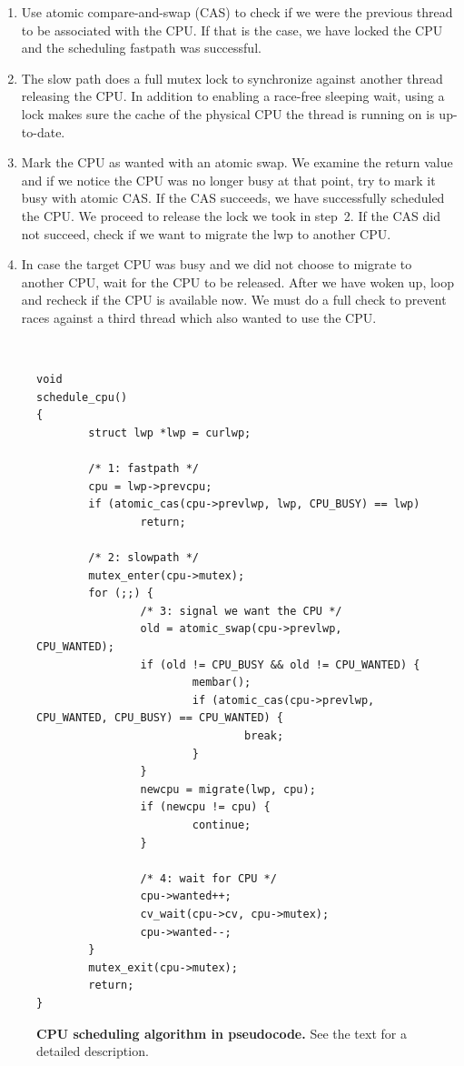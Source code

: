\begin{enumerate}
\item   Use atomic compare-and-swap (CAS) to check if we were the
	previous thread to be associated with the CPU.  If that is
	the case, we have locked the CPU and the scheduling fastpath
	was successful.

\item   The slow path does a full mutex lock to synchronize against
	another thread releasing the CPU.  In addition to enabling
	a race-free sleeping wait, using a lock makes sure the cache of
	the physical CPU the thread is running on is up-to-date.

\item   Mark the CPU as wanted with an atomic swap.  We examine
	the return value and if we notice the CPU was no longer
	busy at that point, try to mark it busy with atomic CAS.
	If the CAS succeeds, we have successfully scheduled the CPU.
	We proceed to release the lock we took in step~2.  If the
	CAS did not succeed, check if we want to migrate the lwp
	to another CPU.

\item   In case the target CPU was busy and we did not choose to
	migrate to another CPU, wait for the CPU to be released.
	After we have woken up, loop and recheck if the CPU is
	available now.  We must do a full check to prevent races
	against a third thread which also wanted to use the CPU.
\end{enumerate}

\begin{figure}[h]
{\tt \scriptsize  
\begin{verbatim}
void
schedule_cpu()
{
        struct lwp *lwp = curlwp;

        /* 1: fastpath */
        cpu = lwp->prevcpu;
        if (atomic_cas(cpu->prevlwp, lwp, CPU_BUSY) == lwp)
                return;

        /* 2: slowpath */
        mutex_enter(cpu->mutex);
        for (;;) {
                /* 3: signal we want the CPU */
                old = atomic_swap(cpu->prevlwp, CPU_WANTED);
                if (old != CPU_BUSY && old != CPU_WANTED) {
                        membar();
                        if (atomic_cas(cpu->prevlwp, CPU_WANTED, CPU_BUSY) == CPU_WANTED) {
                                break;
                        }
                }
                newcpu = migrate(lwp, cpu);
                if (newcpu != cpu) {
                        continue;
                }

                /* 4: wait for CPU */
                cpu->wanted++;
                cv_wait(cpu->cv, cpu->mutex);
                cpu->wanted--;
        }
        mutex_exit(cpu->mutex);
        return;
}
\end{verbatim}}
\caption[CPU scheduling algorithm in pseudocode]{\textbf{CPU scheduling
algorithm in pseudocode.}  See the text for a detailed description.}
\label{fig:cpusched}
\end{figure}
\clearpage

